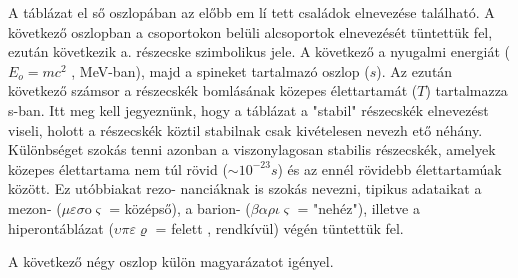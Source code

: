\documentclass[../main.tex]{subfiles}
\begin{document}
A táblázat el ső oszlopában az előbb em lí tett családok elnevezése található. A következő oszlopban a csoportokon belüli alcsoportok elnevezését
tüntettük fel, ezután következik a. részecske szimbolikus jele. A következő a nyugalmi energiát ($E_o = mc^2$ , MeV-ban), majd a spineket tartalmazó
oszlop ($s$). Az ezután következő számsor a részecskék bomlásának közepes
élettartamát ($T$) tartalmazza s-ban. Itt meg kell jegyeznünk, hogy a táblázat a "stabil" részecskék elnevezést viseli, holott a részecskék köztil stabilnak
csak kivételesen nevezh ető néhány. Különbséget szokás tenni azonban a viszonylagosan stabilis részecskék, amelyek közepes élettartama nem túl rövid
($\sim 10^{-23} s$) és az ennél rövidebb élettartamúak között. Ez utóbbiakat rezo-
nanciáknak is szokás nevezni, tipikus adataikat a mezon- ($\mu  \varepsilon \sigma \text{o} \varsigma $ = középső),
a barion- ($\beta \alpha \rho \iota \varsigma$ = "nehéz"), illetve a hiperontáblázat ($\upsilon \pi \varepsilon \varrho$ = felett , rendkívül) végén tüntettük fel.

A következő négy oszlop külön magyarázatot igényel.
\end{document}
